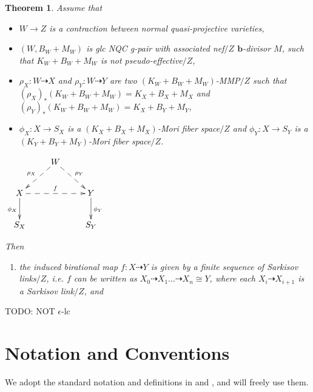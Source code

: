 \documentclass[11pt]{amsart}
\numberwithin{equation}{section}
\newcommand{\bb}{\bm{b}}
\newtheorem{thm}{Theorem}[section]
\theoremstyle{definition}
\theoremstyle{definition}
\theoremstyle{definition}
\begin{document}
\begin{thm}\label{main theorem}
Assume that 
\begin{itemize}
    \item $W\rightarrow Z$ is a contraction between normal quasi-projective varieties,
    \item $(W,B_W+M_W)$ is glc NQC g-pair with associated nef$/Z$ $\bb$-divisor $M$, such that $K_W+B_W+M_W$ is not pseudo-effective$/Z$,
    \item $\rho_X: W\dashrightarrow X$ and $\rho_Y: W\dashrightarrow Y$ are two $(K_W+B_W+M_W)$-MMP$/Z$ such that $(\rho_X)_*(K_W+B_W+M_W)=K_X+B_X+M_X$ and $(\rho_Y)_*(K_W+B_W+M_W)=K_X+B_Y+M_Y$,
    \item $\phi_X: X\rightarrow S_X$ is a $(K_X+B_X+M_X)$-Mori fiber space$/Z$ and $\phi_Y: X\rightarrow S_Y$ is a $(K_Y+B_Y+M_Y)$-Mori fiber space$/Z$.
\end{itemize}
\begin{center}$\xymatrix{
 & W\ar@{-->}[dl]_{\rho_X}\ar@{-->}[dr]^{\rho_Y}& \\
      X \ar@{->}[d]_{\phi_X}\ar@{-->}[rr]^{f}   &  & Y\ar@{->}[d]^{\phi_Y} \\
    S_X & &S_Y }$
\end{center}
Then
\begin{enumerate}
    \item the induced birational map $f: X\dashrightarrow Y$ is given by a finite sequence of Sarkisov links$/Z$, i.e. $f$ can be written as $X_0\dashrightarrow X_1\dots\dashrightarrow X_n\cong Y$, where each $X_{i}\dashrightarrow X_{i+1}$ is a Sarkisov link$/Z$, and
\end{enumerate} 
\end{thm}
TODO: NOT $\epsilon$-lc

\section{Notation and Conventions}

We adopt the standard notation and definitions in \cite{Sho92} and \cite{KM98}, and will freely use them.
\end{document}
